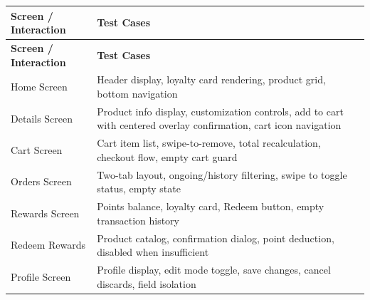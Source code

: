 \setlength{\LTleft}{0pt}\setlength{\LTright}{0pt}
\begin{longtable}{|p{5cm}|p{11cm}|}
  \hline
  \textbf{Screen / Interaction} & \textbf{Test Cases} \\
  \hline
  \endfirsthead
  \hline
  \textbf{Screen / Interaction} & \textbf{Test Cases} \\
  \hline
  \endhead

  Home Screen &
    Header display, loyalty card rendering, product grid, bottom navigation \\
  \hline

  Details Screen &
    Product info display, customization controls, add to cart with centered overlay confirmation, cart icon navigation \\
  \hline

  Cart Screen &
    Cart item list, swipe-to-remove, total recalculation, checkout flow, empty cart guard \\
  \hline

  Orders Screen &
    Two-tab layout, ongoing/history filtering, swipe to toggle status, empty state \\
  \hline

  Rewards Screen &
    Points balance, loyalty card, Redeem button, empty transaction history \\
  \hline

  Redeem Rewards &
    Product catalog, confirmation dialog, point deduction, disabled when insufficient \\
  \hline

  Profile Screen &
    Profile display, edit mode toggle, save changes, cancel discards, field isolation \\

  \hline
\end{longtable}
